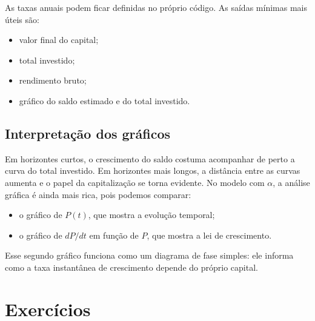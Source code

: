 \documentclass[11pt,a4paper]{article}
\begin{document}
As taxas anuais podem ficar definidas no próprio código. As saídas mínimas mais úteis são:
\begin{itemize}[leftmargin=*, itemsep=0.2em]
    \item valor final do capital;
    \item total investido;
    \item rendimento bruto;
    \item gráfico do saldo estimado e do total investido.
\end{itemize}

\subsection{Interpretação dos gráficos}

Em horizontes curtos, o crescimento do saldo costuma acompanhar de perto a curva do
total investido. Em horizontes mais longos, a distância entre as curvas aumenta e o papel
da capitalização se torna evidente. No modelo com \(\alpha\), a análise gráfica é ainda
mais rica, pois podemos comparar:

\begin{itemize}[leftmargin=*, itemsep=0.2em]
    \item o gráfico de \(P(t)\), que mostra a evolução temporal;
    \item o gráfico de \(dP/dt\) em função de \(P\), que mostra a lei de crescimento.
\end{itemize}

Esse segundo gráfico funciona como um diagrama de fase simples: ele informa como a taxa
instantânea de crescimento depende do próprio capital.

\section{Exercícios}
\end{document}

